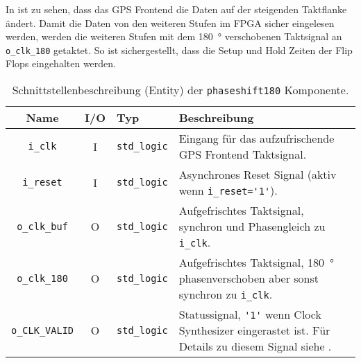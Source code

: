 In  ist zu sehen, dass das GPS Frontend die Daten auf der steigenden Taktflanke ändert. Damit die Daten von den weiteren Stufen im FPGA sicher eingelesen werden, werden die weiteren Stufen mit dem \SI{180}{\degree} verschobenen Taktsignal an \lstinline$o_clk_180$ getaktet. So ist sichergestellt, dass die Setup und Hold Zeiten der Flip Flops eingehalten werden.


\begin{table}[htbp]
    \ttabbox
    {
        \caption[Clock Synthesizer Schnittstelle]{Schnittstellenbeschreibung (Entity) der \lstinline$phaseshift180$ Komponente.}
        \label{TabPhaseshift180_Entity}
    }
    {
    \begin{tabular}{c c  p{2cm} p{6cm}}
        \toprule
        Name                    & I/O   & Typ                   & Beschreibung \\
        \midrule
        \lstinline$i_clk$       & I     & \lstinline$std_logic$ & Eingang für das aufzufrischende GPS Frontend Taktsignal. \\
        \lstinline$i_reset$     & I     & \lstinline$std_logic$ & Asynchrones Reset Signal (aktiv wenn \lstinline$i_reset='1'$). \\
        \lstinline$o_clk_buf$   & O     & \lstinline$std_logic$ & Aufgefrischtes Taktsignal, synchron und Phasengleich zu \lstinline$i_clk$. \\
        \lstinline$o_clk_180$   & O     & \lstinline$std_logic$ & Aufgefrischtes Taktsignal, \SI{180}{\degree} phasenverschoben aber sonst synchron zu \lstinline$i_clk$. \\
        \lstinline$o_CLK_VALID$ & O     & \lstinline$std_logic$ & Statussignal, \lstinline$'1'$ wenn Clock Synthesizer eingerastet ist. Für Details zu diesem Signal siehe \cite{SP6Clock}.\\
        \bottomrule
    \end{tabular}
}
\end{table}
